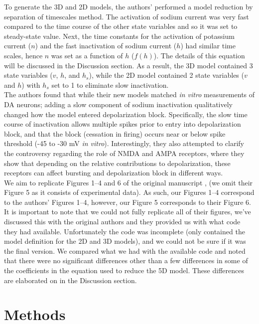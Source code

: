 To generate the 3D and 2D models, the authors’ performed a model reduction by separation of timescales method. The activation of sodium current was very fast compared to the time course of the other state variables and so it was set to steady-state value. Next, the time constants for the activation of potassium current ($n$) and the fast inactivation of sodium current ($h$) had similar time scales, hence $n$ was set as a function of $h$ ($f(h)$). The details of this equation will be discussed in the Discussion section. As a result, the 3D model contained 3 state variables ($v$, $h$, and $h_s$), while the 2D model contained 2 state variables ($v$ and $h$) with $h_s$ set to 1 to eliminate slow inactivation. \\

The authors found that while their new models matched \emph{in vitro} measurements of DA neurons; adding a slow component of sodium inactivation qualitatively changed how the model entered depolarization block. Specifically, the slow time course of inactivation allows multiple spikes prior to entry into depolarization block, and that the block (cessation in firing) occurs near or below spike threshold (-45 to -30 mV \emph{in vitro}). Interestingly, they also attempted to clarify the controversy regarding the role of NMDA and AMPA receptors, where they show that depending on the relative contributions to depolarization, these receptors can affect bursting and depolarization block in different ways.\\

We aim to replicate Figures 1--4 and 6 of the original manuscript \cite{Qian2014}, (we omit their Figure 5 as it consists of experimental data). As such, our Figures 1--4 correspond to the authors' Figures 1--4, however, our Figure 5 corresponds to their Figure 6. It is important to note that we could not fully replicate all of their figures, we've discussed this with the original authors and they provided us with what code they had available. Unfortunately the code was incomplete (only contained the model definition for the 2D and 3D models), and we could not be sure if it was the final version. We compared what we had with the available code and noted that there were no significant differences other than a few differences in some of the coefficients in the equation used to reduce the 5D model. These differences are elaborated on in the Discussion section.



\section{Methods}

